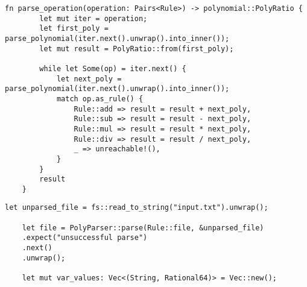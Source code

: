 \begin{lstlisting}[caption={The implementation of the \texttt{parse\_operation()} function}, label={lst:parse-operation}]
    fn parse_operation(operation: Pairs<Rule>) -> polynomial::PolyRatio {
        let mut iter = operation;
        let first_poly = parse_polynomial(iter.next().unwrap().into_inner());
        let mut result = PolyRatio::from(first_poly);
    
        while let Some(op) = iter.next() {
            let next_poly = parse_polynomial(iter.next().unwrap().into_inner());
            match op.as_rule() {
                Rule::add => result = result + next_poly,
                Rule::sub => result = result - next_poly,
                Rule::mul => result = result * next_poly,
                Rule::div => result = result / next_poly,
                _ => unreachable!(),
            }
        }
        result
    }        
\end{lstlisting}

\begin{lstlisting}[caption={Reading and parsing user input, and defining storage for custom variable values}, label={lst:reading-parsing-input}]
    let unparsed_file = fs::read_to_string("input.txt").unwrap();

    let file = PolyParser::parse(Rule::file, &unparsed_file)
    .expect("unsuccessful parse")
    .next()
    .unwrap();

    let mut var_values: Vec<(String, Rational64)> = Vec::new();
\end{lstlisting}


